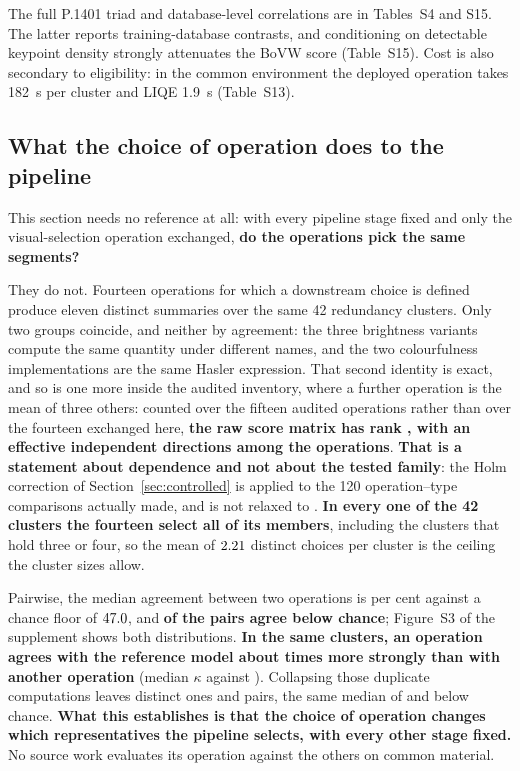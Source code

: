 The full P.1401 triad and database-level correlations are in Tables~S4 and S15.
The latter reports training-database contrasts, and conditioning on detectable keypoint density strongly attenuates the BoVW score (Table~S15). Cost is also secondary to
eligibility: in the common environment the deployed operation takes 182~s per
cluster and LIQE 1.9~s (Table~S13).

\subsection{What the choice of operation does to the pipeline}\label{sec:menu}

This section needs no reference at all: with every pipeline stage fixed and only the
visual-selection operation exchanged, \textbf{do the operations pick the same segments?}

They do not. Fourteen operations for which a downstream choice is defined produce eleven
distinct summaries over the same 42 redundancy clusters. Only two groups coincide, and neither by agreement: the three brightness variants compute
the same quantity under different names, and the two colourfulness implementations are the
same Hasler expression. That second identity is exact, and so is one more inside the
audited inventory, where a further operation is the mean of three others: counted over the
fifteen audited operations rather than over the fourteen exchanged here, \textbf{the raw
score matrix has rank \effPosto{}, with an effective \effMeff{} independent directions
among the operations}. \textbf{That is a statement about dependence and not about the
tested family}: the Holm correction of Section~\ref{sec:controlled} is applied to the 120
operation--type comparisons actually made, and is not relaxed to \effMeff{}.
\textbf{In every one of the 42 clusters the fourteen select all of its members},
including the \escGrandes{} clusters that hold three or four, so the mean of
$2.21{}$ distinct choices per cluster is the ceiling the cluster sizes allow.

Pairwise, the median agreement between two operations is \dupComMediana{} per cent against
a chance floor of $47.0{}$, and \textbf{\dupComAbaixo{} of the \dupComPares{} pairs
agree below chance}; Figure~S3 of the supplement shows both distributions. \textbf{In the same clusters, an
operation agrees with the reference model about \claRazao{} times more strongly than with
another operation} (median $\kappa$ \pisoKapOp{} against \claPar{}). Collapsing those duplicate computations leaves \dupDistintas{} distinct ones and
\dupPares{} pairs, the same median of \dupMediana{} and \dupAbaixo{} below chance.
\textbf{What this establishes is that the choice of operation changes which representatives
the pipeline selects, with every other stage fixed.} No source work evaluates its operation
against the others on common material.

